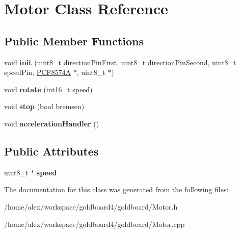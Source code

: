 \hypertarget{class_motor}{}\section{Motor Class Reference}
\label{class_motor}
\subsection*{Public Member Functions}
\begin{DoxyCompactItemize}
\item 
void {\bfseries init} (uint8\+\_\+t direction\+Pin\+First, uint8\+\_\+t direction\+Pin\+Second, uint8\+\_\+t speed\+Pin, \hyperlink{class_p_c_f8574_a}{P\+C\+F8574A} $\ast$, uint8\+\_\+t $\ast$)\hypertarget{class_motor_a9bfe106b0b35300d4c50bdb996a6d75c}{}\label{class_motor_a9bfe106b0b35300d4c50bdb996a6d75c}

\item 
void {\bfseries rotate} (int16\+\_\+t speed)\hypertarget{class_motor_aa5088f286e723e55cc38fe712e847c63}{}\label{class_motor_aa5088f286e723e55cc38fe712e847c63}

\item 
void {\bfseries stop} (bool bremsen)\hypertarget{class_motor_ab0b38acc90da22cbeb5f4b0234616e52}{}\label{class_motor_ab0b38acc90da22cbeb5f4b0234616e52}

\item 
void {\bfseries acceleration\+Handler} ()\hypertarget{class_motor_a71e53d91b88aa532c4ae8bccac3a85ad}{}\label{class_motor_a71e53d91b88aa532c4ae8bccac3a85ad}

\end{DoxyCompactItemize}
\subsection*{Public Attributes}
\begin{DoxyCompactItemize}
\item 
uint8\+\_\+t $\ast$ {\bfseries speed}\hypertarget{class_motor_a1dbc9bc30ae5271f34b31c8d0ea59d0b}{}\label{class_motor_a1dbc9bc30ae5271f34b31c8d0ea59d0b}

\end{DoxyCompactItemize}


The documentation for this class was generated from the following files\+:\begin{DoxyCompactItemize}
\item 
/home/alex/workspace/goldboard4/goldboard/Motor.\+h\item 
/home/alex/workspace/goldboard4/goldboard/Motor.\+cpp\end{DoxyCompactItemize}

